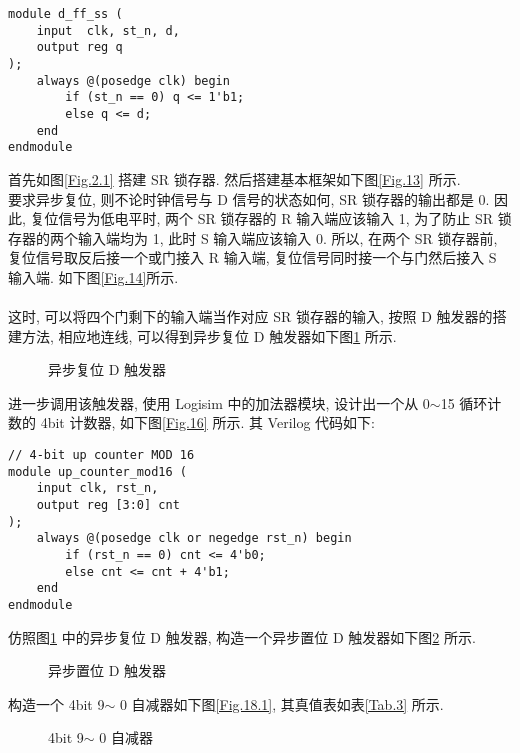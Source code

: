 \documentclass[UTF8,fontset=fandol]{ctexart}
\begin{document}
\begin{ExQuestions}
\begin{lstlisting}[style=verilogstyle, caption={同步置位 D 触发器}, label={Code.6}]
module d_ff_ss (
    input  clk, st_n, d, 
    output reg q 
);
    always @(posedge clk) begin
        if (st_n == 0) q <= 1'b1;
        else q <= d;
    end
endmodule
  \end{lstlisting}
  \question 首先如图\ref{Fig.2.1} 搭建 SR 锁存器. 然后搭建基本框架如下图\ref{Fig.13} 所示.
  \\
  要求异步复位, 则不论时钟信号与 D 信号的状态如何, SR 锁存器的输出都是 0. 因此, 复位信号为低电平时, 两个 SR 锁存器的 R 输入端应该输入 1, 为了防止 SR 锁存器的两个输入端均为 1, 此时 S 输入端应该输入 0. 所以, 在两个 SR 锁存器前, 复位信号取反后接一个或门接入 R 输入端, 复位信号同时接一个与门然后接入 S 输入端. 如下图\ref{Fig.14}所示.\\
  \\
  这时, 可以将四个门剩下的输入端当作对应 SR 锁存器的输入, 按照 D 触发器的搭建方法, 相应地连线, 可以得到异步复位 D 触发器如下图\ref{Fig.15} 所示.
  \begin{figure}[h]
    \centering
    \caption{异步复位 D 触发器}
    \label{Fig.15}
  \end{figure}

  进一步调用该触发器, 使用 Logisim 中的加法器模块, 设计出一个从 0$\sim $15 循环计数的 4bit 计数器, 如下图\ref{Fig.16} 所示.
  其 Verilog 代码如下:
  \begin{lstlisting}[style=verilogstyle, caption={0$\sim $15 循环计数 4bit 计数器}, label={Code.7}]
// 4-bit up counter MOD 16
module up_counter_mod16 (
    input clk, rst_n,
    output reg [3:0] cnt
);
    always @(posedge clk or negedge rst_n) begin
        if (rst_n == 0) cnt <= 4'b0;
        else cnt <= cnt + 4'b1;
    end
endmodule
  \end{lstlisting}
  \question 仿照图\ref{Fig.15} 中的异步复位 D 触发器, 构造一个异步置位 D 触发器如下图\ref{Fig.17} 所示.
  \begin{figure}[h]
    \centering
    \caption{异步置位 D 触发器}
    \label{Fig.17}
  \end{figure}

  构造一个 4bit 9$\sim$ 0 自减器如下图\ref{Fig.18.1}, 其真值表如表\ref{Tab.3} 所示.\\
  \begin{figure}[h]
    \centering
    \caption{4bit 9$\sim$ 0 自减器}
    \label{Fig.18}
  \end{figure}


\end{ExQuestions}
\end{document}

